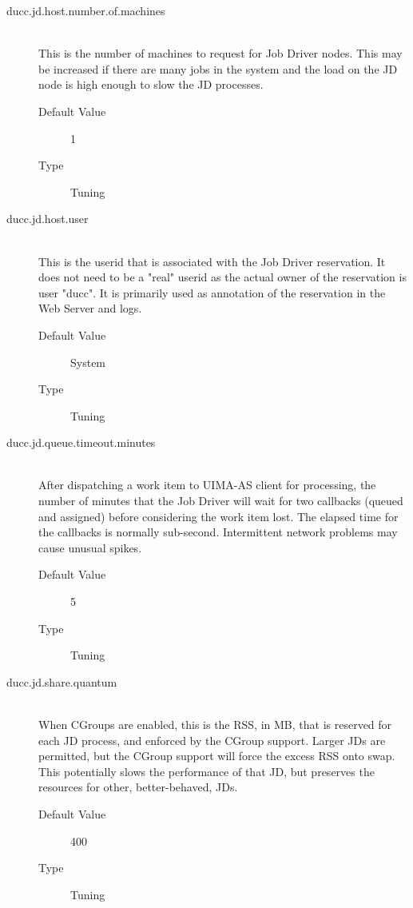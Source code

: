 \begin{description}
        \item[ducc.jd.host.number.of.machines] \hfill \\
          This is the number of machines to request for Job Driver nodes. This may be increased if 
          there are many jobs in the system and the load on the JD node is high enough to slow the 
          JD processes. 
          \begin{description}
            \item[Default Value] 1 
            \item[Type] Tuning 
          \end{description}
          

        \item[ducc.jd.host.user] \hfill \\
          This is the userid that is associated with the Job Driver reservation. It does not need to be 
          a "real" userid as the actual owner of the reservation is user "ducc". It is primarily used as 
          annotation of the reservation in the Web Server and logs. 
          \begin{description}
            \item[Default Value] System 
            \item[Type] Tuning 
          \end{description}


        \item[ducc.jd.queue.timeout.minutes] \hfill \\
         After dispatching a work item to UIMA-AS client for processing, the
         number of minutes that the Job Driver will wait for two callbacks
         (queued and assigned) before considering the work item lost. The
         elapsed time for the callbacks is normally sub-second. Intermittent
         network problems may cause unusual spikes.
          \begin{description}
            \item[Default Value] 5
            \item[Type] Tuning 
          \end{description}


        \item[ducc.jd.share.quantum] \hfill \\
          When CGroups are enabled, this is the RSS, in MB, that is reserved for each JD process, and enforced
          by the CGroup support.  Larger JDs are permitted, but the CGroup support will force the excess
          RSS onto swap.  This potentially slows the performance of that JD, but preserves the resources
          for other, better-behaved, JDs.
          \begin{description}
            \item[Default Value] 400
            \item[Type] Tuning 
          \end{description}

      \end{description}
      
